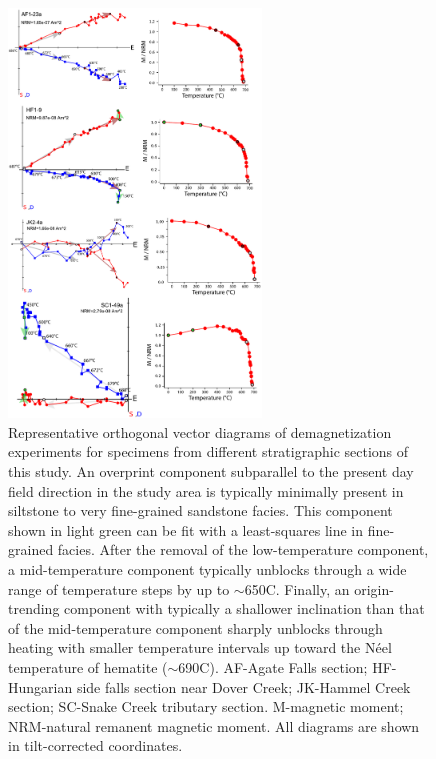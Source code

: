 \begin{figure}
\centering
\includegraphics[width=0.6\textwidth]{figure/Zhang2024a/SI_orthogonal.pdf}
\caption{Representative orthogonal vector diagrams of demagnetization experiments for specimens from different stratigraphic sections of this study. An overprint component subparallel to the present day field direction in the study area is typically minimally present in siltstone to very fine-grained sandstone facies. This component shown in light green can be fit with a least-squares line in fine-grained facies. After the removal of the low-temperature component, a mid-temperature component typically unblocks through a wide range of temperature steps by up to $\sim$650\textdegree C. Finally, an origin-trending component with typically a shallower inclination than that of the mid-temperature component sharply unblocks through heating with smaller temperature intervals up toward the N\'eel temperature of hematite ($\sim$690\textdegree C). AF-Agate Falls section; HF-Hungarian side falls section near Dover Creek; JK-Hammel Creek section; SC-Snake Creek tributary section. M-magnetic moment; NRM-natural remanent magnetic moment. All diagrams are shown in tilt-corrected coordinates.}
\label{fig:SI_orthogonal}
\end{figure}

